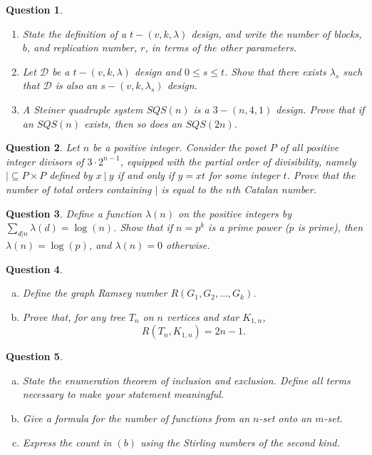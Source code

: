 \documentclass[12]{article}
\newtheorem{question}{Question}
\theoremstyle{definition}
\begin{document}
	\begin{question}
		\
		\begin{enumerate}
			\item State the definition of a $t-(v,k,\lambda)$ design, and write the number of blocks, $b$, and replication number, $r$, in terms of the other parameters.
			\item Let $\mathcal{D}$ be a $t-(v,k,\lambda)$ design and $0 \leq s \leq t$.  Show that there exists $\lambda_s$ such that $\mathcal{D}$ is also an $s-(v,k,\lambda_s)$ design.
			\item A Steiner quadruple system $SQS(n)$ is a $3-(n,4,1)$ design.  Prove that if an $SQS(n)$ exists, then so does an $SQS(2n)$.
		\end{enumerate}
	\end{question}

	\begin{question}
		Let $n$ be a positive integer.  Consider the poset $P$ of all positive integer divisors of $3 \cdot 2^{n-1}$, equipped with the partial order of divisibility, namely $|\subseteq P \times P$ defined by $x \ | \ y$ if and only if $y = xt$ for some integer $t$.  Prove that the number of total orders containing $|$ is equal to the $n$th Catalan number.
	\end{question}

	\begin{question}
		Define a function $\lambda(n)$ on the positive integers by $\sum_{d|n} \lambda(d) = \log(n)$.  Show that if $n = p^k$ is a prime power ($p$ is prime), then $\lambda(n) = \log(p)$, and $\lambda(n) = 0$ otherwise.
	\end{question}

	\begin{question}
		\
		\begin{enumerate}[a)]
			\item Define the graph Ramsey number $R(G_1, G_2, \ldots, G_k)$.
			\item Prove that, for any tree $T_n$ on $n$ vertices and star $K_{1,n}$,
			$$R(T_n,K_{1,n}) = 2n-1.$$
		\end{enumerate}
	\end{question}

	\begin{question}
		\
		\begin{enumerate}[a)]
			\item State the enumeration theorem of inclusion and exclusion.  Define all terms necessary to make your statement meaningful.
			\item Give a formula for the number of functions from an $n$-set onto an $m$-set.
			\item Express the count in $(b)$ using the Stirling numbers of the second kind.
		\end{enumerate}
	
	\end{question}
\end{document}
